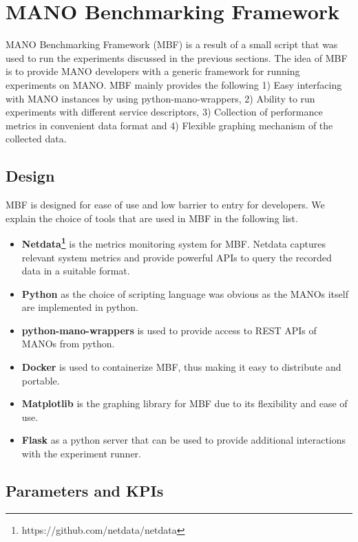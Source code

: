 \section{MANO Benchmarking Framework} 

MANO Benchmarking Framework (MBF) is a result of a small script that was used to run the experiments discussed in the previous sections. The idea of MBF is to provide MANO developers with a generic framework for running experiments on MANO.
MBF mainly provides the following 1) Easy interfacing with MANO instances by using python-mano-wrappers, 2) Ability to run experiments with different service descriptors, 3) Collection of performance metrics in convenient data format and 4) Flexible graphing mechanism of the collected data. 


\subsection{Design}

MBF is designed for ease of use and low barrier to entry for developers. 
We explain the choice of tools that are used in MBF in the following list.

\begin{itemize}
	\item{\textbf{Netdata\footnote{https://github.com/netdata/netdata}}} is the metrics monitoring system for MBF. 
	Netdata captures relevant system metrics and provide powerful APIs to query the recorded data in a suitable format.
	\item{\textbf{Python}} as the choice of scripting language was obvious as the MANOs itself are implemented in python.
	\item{\textbf{python-mano-wrappers}} is used to provide access to REST APIs of MANOs from python.
	\item{\textbf{Docker}} is used to containerize MBF, thus making it easy to distribute and portable.
	\item{\textbf{Matplotlib}} is the graphing library for MBF due to its flexibility and ease of use.
	\item{\textbf{Flask}} as a python server that can be used to provide additional interactions with the experiment runner.

\end{itemize}


\subsection{Parameters and KPIs} 

